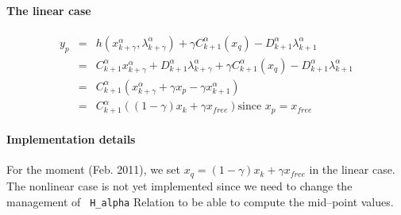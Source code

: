 \paragraph{The linear case}
\begin{equation}
  \begin{array}{lcl}
    y_p &=&  h(x^{\alpha}_{k+\gamma},\lambda^{\alpha}_{k+\gamma}) + \gamma C^{\alpha}_{k+1}(x_q) - D^{\alpha}_{k+1} \lambda^{\alpha}_{k+1}\\
        &=&  C^{\alpha}_{k+1} x^{\alpha}_{k+\gamma} + D^{\alpha}_{k+1}\lambda^{\alpha}_{k+\gamma}  + \gamma C^{\alpha}_{k+1}(x_q) - D^{\alpha}_{k+1} \lambda^{\alpha}_{k+1} \\
        &=& C^{\alpha}_{k+1}  (x^{\alpha}_{k+\gamma} + \gamma x_p - \gamma x^{\alpha}_{k+1} ) \\
        &=& C^{\alpha}_{k+1}  ((1-\gamma) x_{k} + \gamma x_{free} ) \text {since } x_p =x_{free}
\end{array}
\end{equation}




\paragraph{Implementation details}

For the moment (Feb. 2011), we set $x_q=(1-\gamma) x_{k} + \gamma x_{free} $ in the linear case.
The nonlinear case is not yet implemented since we need to
change the management of \texttt{ H_alpha} Relation to be able to compute the mid--point values.
%








\clearpage


